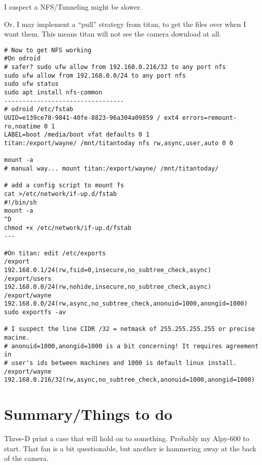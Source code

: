 \documentclass[letter,11pt,oneside]{article}
\begin{document}
I suspect a NFS/Tunneling might be slower.

Or, I may implement a ``pull'' strategy from titan, to
get the files over when I want them. This means titan will
not see the camera download at all.

\begin{tcolorbox}[breakable]
\begingroup \fontsize{10pt}{10pt}
\selectfont
\begin{verbatim} 
# Now to get NFS working
#On odroid
# safer? sudo ufw allow from 192.168.0.216/32 to any port nfs
sudo ufw allow from 192.168.0.0/24 to any port nfs
sudo ufw status
sudo apt install nfs-common
---------------------------------
# odroid /etc/fstab
UUID=e139ce78-9841-40fe-8823-96a304a09859 / ext4 errors=remount-ro,noatime 0 1
LABEL=boot /media/boot vfat defaults 0 1
titan:/export/wayne/ /mnt/titantoday nfs rw,async,user,auto 0 0 

mount -a
# manual way... mount titan:/export/wayne/ /mnt/titantoday/

# add a config script to mount fs
cat >/etc/network/if-up.d/fstab
#!/bin/sh
mount -a
^D
chmod +x /etc/network/if-up.d/fstab
---

#On titan: edit /etc/exports
/export       192.168.0.1/24(rw,fsid=0,insecure,no_subtree_check,async)
/export/users 192.168.0.0/24(rw,nohide,insecure,no_subtree_check,async)
/export/wayne 192.168.0.0/24(rw,async,no_subtree_check,anonuid=1000,anongid=1000)
sudo exportfs -av

# I suspect the line CIDR /32 = netmask of 255.255.255.255 or precise macine.
# anonuid=1000,anongid=1000 is a bit concerning! It requires agreement in
# user's ids between machines and 1000 is default linux install.
/export/wayne 192.168.0.216/32(rw,async,no_subtree_check,anonuid=1000,anongid=1000)

\end{verbatim}
\endgroup
\end{tcolorbox}
\section{Summary/Things to do}

Three-D print a case that will hold on to something. Probably
my Alpy-600 to start. That fan is a bit questionable, but another
is hammering away at the back of the camera.
\end{document}
